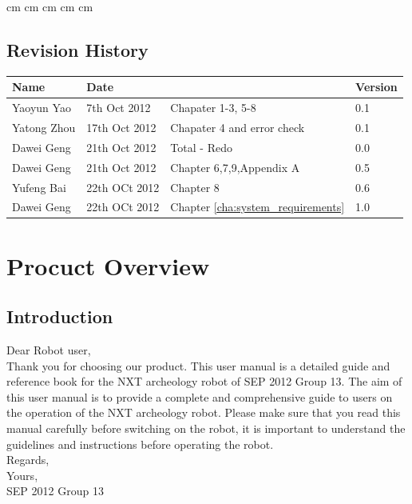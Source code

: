 \documentclass[11pt, a4paper]{report}
\begin{document}
 cm
 cm
 cm
 cm
 cm

\tableofcontents






\clearpage
\section*{Revision History}
\begin{tabular}{| l | l | l | l | }
\hline
Name			& Date				&									&	Version   \\ \hline
Yaoyun Yao		& 7th Oct 2012		& Chapater 1-3, 5-8					&	0.1       \\ \hline
Yatong Zhou		& 17th Oct 2012		& Chapater 4 and error check 		&	0.1       \\ \hline
Dawei Geng		& 21th Oct 2012		& Total - Redo						&	0.0       \\ \hline
Dawei Geng		& 21th Oct 2012		& Chapter 6,7,9,Appendix A 			&	0.5       \\ \hline
Yufeng Bai		&22th OCt 2012		& Chapter 8							&	0.6			\\ \hline
Dawei Geng		&22th OCt 2012		& Chapter \ref{cha:system_requirements}	&	1.0			\\ \hline

\end{tabular}
\clearpage

\chapter{Procuct Overview} %
\label{cha:procuct_overview}
\section{Introduction}
Dear Robot user,\\
Thank you for choosing our product. This user manual is a detailed guide and reference book for the NXT archeology robot of SEP 2012 Group 13. The aim of this user manual is to provide a complete and comprehensive guide to users on the operation of the NXT archeology robot. Please make sure that you read this manual carefully before switching on the robot, it is important to understand the guidelines and instructions before operating the robot.\\
Regards,\\
Yours,\\ 
\flushright SEP 2012 Group 13
\flushleft
\end{document}
